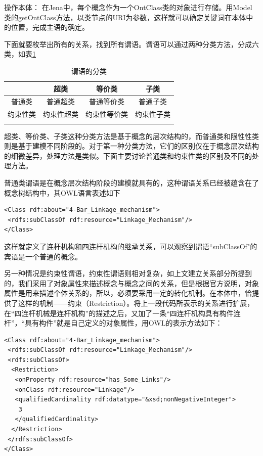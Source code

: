 \documentclass[12pt,a4paper]{article}
\begin{document}
	
	操作本体：		
	在Jena中，每个概念作为一个OntClass类的对象进行存储。用Model类的getOntClass方法，以类节点的URI为参数，这样就可以确定关键词在本体中的位置，完成主语的确定。
	
	下面就要枚举出所有的关系，找到所有谓语。谓语可以通过两种分类方法，分成六类，如表\ref{tb:谓语分类}

\begin{table}[htbp]
\centering
\caption{\label{tb:谓语分类}谓语的分类}
\begin{tabular}{c|c|c|c}
\Xhline{1.5pt}
 & 超类 & 等价类 & 子类\\
\hline
 普通类 & 普通超类 & 普通等价类 & 普通子类\\
\hline
 约束性类  & 约束性超类 & 约束性等价类 & 约束性子类\\
\Xhline{1.5pt}
\end{tabular}
\end{table}

	超类、等价类、子类这种分类方法是基于概念的层次结构的，而普通类和限性性类则是基于建模不同阶段的。对于第一种分类方法，它们的区别仅在于概念层次结构的细微差异，处理方法是类似。下面主要讨论普通类和约束性类的区别及不同的处理方法。
	
	普通类谓语是在概念层次结构阶段的建模就具有的，这种谓语关系已经被蕴含在了概念树结构中，其OWL语言表述如下
	
	\lstset{language=XML,frame=lines}
	\begin{lstlisting}
<Class rdf:about="4-Bar_Linkage_mechanism">
 <rdfs:subClassOf rdf:resource="Linkage_Mechanism"/>
</Class>
	\end{lstlisting}
	
	这样就定义了连杆机构和四连杆机构的继承关系，可以观察到谓语“subClassOf"的宾语是一个普通的概念。
	
	另一种情况是约束性谓语，约束性谓语则相对复杂，如上文建立关系部分所提到的，我们采用了对象属性来描述概念与概念之间的关系，但是根据官方说明，对象属性是用来描述个体关系的，所以，必须要采用一定的转化机制。在本体中，恰提供了这样的机制——约束（Restriction）。将上一段代码所表示的关系进行扩展，在“四连杆机械是连杆机构”的描述之后，又加了一条“四连杆机构具有构件连杆”，“具有构件”就是自己定义的对象属性，用OWL的表示方法如下：
	
	\begin{lstlisting}
<Class rdf:about="4-Bar_Linkage_mechanism">
 <rdfs:subClassOf rdf:resource="Linkage_Mechanism"/>
 <rdfs:subClassOf>
  <Restriction>
   <onProperty rdf:resource="has_Some_Links"/>
   <onClass rdf:resource="Linkage"/>
   <qualifiedCardinality rdf:datatype="&xsd;nonNegativeInteger">
    3
   </qualifiedCardinality>
  </Restriction>
 </rdfs:subClassOf>
</Class>
	\end{lstlisting}
	
\end{document}
